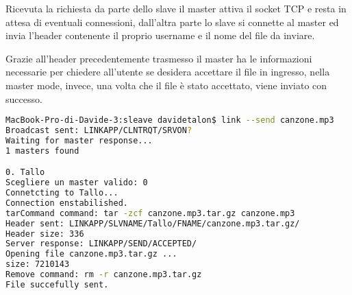 \documentclass[11pt,fleqn]{book} %
\begin{document}
Ricevuta la richiesta da parte dello slave il master attiva il socket TCP e resta in attesa di eventuali connessioni, dall'altra parte lo slave si connette al master ed invia l'header contenente il proprio username e il nome del file da inviare.

\begin{Parallel}{0.5\textwidth}{0.5\textwidth}
\ParallelPar
\end{Parallel}

Grazie all'header precedentemente trasmesso il master ha le informazioni necessarie per chiedere all'utente se desidera accettare il file in ingresso, nella master mode, invece, una volta che il file è stato accettato, viene inviato con successo.

\begin{lstlisting}[language=Bash]
MacBook-Pro-di-Davide-3:sleave davidetalon$ link --send canzone.mp3
Broadcast sent: LINKAPP/CLNTRQT/SRVON?
Waiting for master response...
1 masters found

0. Tallo
Scegliere un master valido: 0
Connetcting to Tallo...
Connection enstabilished.
tarCommand command: tar -zcf canzone.mp3.tar.gz canzone.mp3
Header sent: LINKAPP/SLVNAME/Tallo/FNAME/canzone.mp3.tar.gz/
Header size: 336
Server response: LINKAPP/SEND/ACCEPTED/
Opening file canzone.mp3.tar.gz ...
size: 7210143
Remove command: rm -r canzone.mp3.tar.gz
File succefully sent.
\end{lstlisting}
\end{document}
